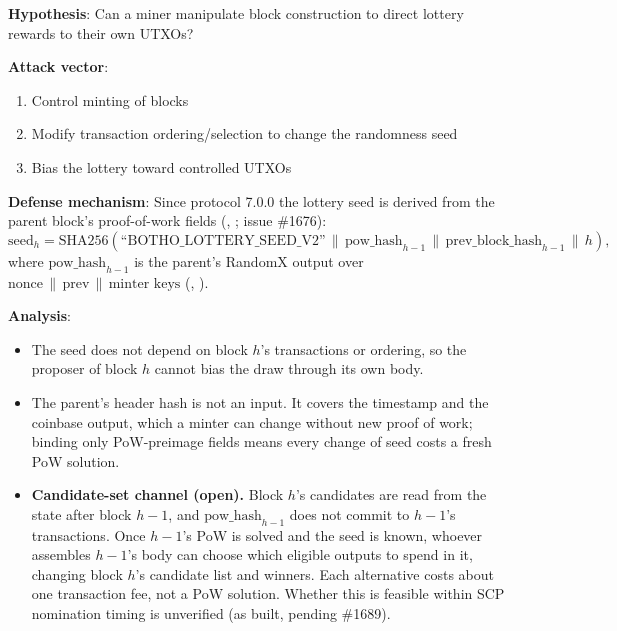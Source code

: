 \textbf{Hypothesis}: Can a miner manipulate block construction to direct
lottery rewards to their own UTXOs?

\textbf{Attack vector}:
\begin{enumerate}
  \item Control minting of blocks
  \item Modify transaction ordering/selection to change the randomness seed
  \item Bias the lottery toward controlled UTXOs
\end{enumerate}

\textbf{Defense mechanism}: Since protocol 7.0.0 the lottery seed is
derived from the parent block's proof-of-work fields
(, ;
issue \#1676):
\[
\text{seed}_h = \text{SHA256}(\text{``BOTHO\_LOTTERY\_SEED\_V2''} \,\|\, \text{pow\_hash}_{h-1} \,\|\, \text{prev\_block\_hash}_{h-1} \,\|\, h),
\]
where $\text{pow\_hash}_{h-1}$ is the parent's RandomX output over
$\text{nonce} \,\|\, \text{prev} \,\|\, \text{minter keys}$
(, ).

\textbf{Analysis}:
\begin{itemize}
  \item The seed does not depend on block $h$'s transactions or ordering, so
    the proposer of block $h$ cannot bias the draw through its own body.
  \item The parent's header hash is not an input. It covers the timestamp
    and the coinbase output, which a minter can change without new proof of
    work; binding only PoW-preimage fields means every change of seed costs a
    fresh PoW solution.
  \item \textbf{Candidate-set channel (open).} Block $h$'s candidates are read
    from the state after block $h-1$, and $\text{pow\_hash}_{h-1}$ does not
    commit to $h-1$'s transactions. Once $h-1$'s PoW is solved and the seed is
    known, whoever assembles $h-1$'s body can choose which eligible outputs to
    spend in it, changing block $h$'s candidate list and winners. Each
    alternative costs about one transaction fee, not a PoW solution. Whether
    this is feasible within SCP nomination timing is unverified (as built,
    pending \#1689).
\end{itemize}

